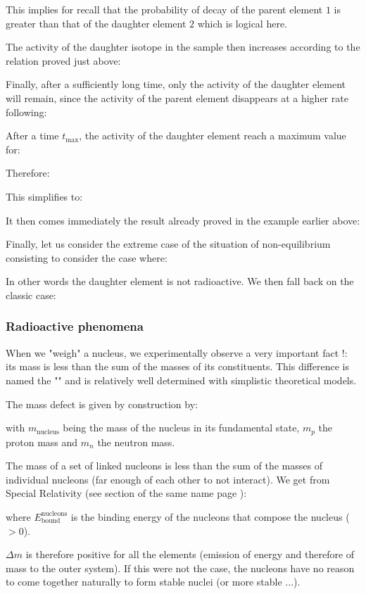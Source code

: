 	This implies for recall that the probability of decay of the parent element $1$ is greater than that of the daughter element $2$ which is logical here.

	The activity of the daughter isotope in the sample then increases according to the relation proved just above:
	
	Finally, after a sufficiently long time, only the activity of the daughter element will remain, since the activity of the parent element disappears at a higher rate following:
	
	After a time $t_{\max}$, the activity of the daughter element reach a maximum value for:
	
	Therefore:
	
	This simplifies to:
	
	It then comes immediately the result already proved in the example earlier above:
	
	Finally, let us consider the extreme case of the situation of non-equilibrium consisting to consider the case where:
	
	In other words the daughter element is not radioactive. We then fall back on the classic case:
	
	
	\subsubsection{Radioactive phenomena}
	When we "weigh" a nucleus, we experimentally observe a very important fact !: its mass is less than the sum of the masses of its constituents. This difference is named the "" and is relatively well determined with simplistic theoretical models.

	The mass defect is given by construction by:
	
	with $m_\text{nucleus}$ being the mass of the nucleus in its fundamental state, $m_p$ the proton mass and $m_n$  the neutron mass.

	The mass of a set of linked nucleons is less than the sum of the masses of individual nucleons (far enough of each other to not interact). We get from Special Relativity (see section of the same name page \pageref{mass energy equivalence}):
	
	where $E_\text{bound}^\text{nucleons}$ is the binding energy of the nucleons that compose the nucleus ($> 0$).
	
	$\Delta m$ is therefore positive for all the elements (emission of energy and therefore of mass to the outer system). If this were not the case, the nucleons have no reason to come together naturally to form stable nuclei (or more stable ...).
	
